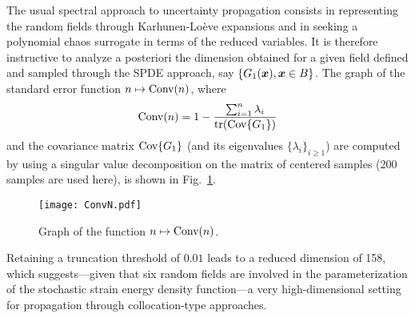 \begin{remark}
The usual spectral approach to uncertainty propagation consists in representing the random fields through Karhunen-Lo\`eve expansions and in seeking a polynomial chaos surrogate in terms of the reduced variables. It is therefore instructive to analyze a posteriori the dimension obtained for a given field defined and sampled through the SPDE approach, say $\{G_1(\boldsymbol{x}), \boldsymbol{x} \in B\}$. The graph of the standard error function $n \mapsto \textnormal{Conv}(n)$, where
\begin{equation}
    \textnormal{Conv}(n) = 1 - \frac{\sum_{i = 1}^{n} \lambda_i}{\textnormal{tr}(\textnormal{Cov}\{G_1\})}
\end{equation}
and the covariance matrix $\textnormal{Cov}\{G_1\}$ (and its eigenvalues $\{\lambda_i\}_{i \geq 1}$) are computed by using a singular value decomposition on the matrix of centered samples (200 samples are used here), is shown in Fig.~\ref{fig:conv}.
\begin{figure}[ht!]
    \begin{center}
        \texttt{[image: ConvN.pdf]}
    \end{center}
    \caption[Graph of the function $n \mapsto \textnormal{Conv}(n)$.]{Graph of the function $n \mapsto \textnormal{Conv}(n)$.}
    \label{fig:conv}
\end{figure}
Retaining a truncation threshold of $0.01$ leads to a reduced dimension of 158, which suggests---given that six random fields are involved in the parameterization of the stochastic strain energy density function---a very high-dimensional setting for propagation through collocation-type approaches.
\end{remark}